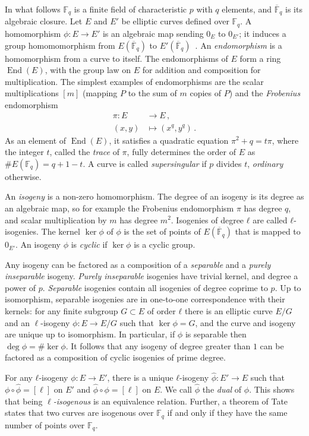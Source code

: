\documentclass{article}
\newcommand{\F}{\mathbb{F}}
\newcommand{\Fbar}{\overline{\mathbb{F}}}
\theoremstyle{definition}
\DeclareMathOperator{\End}{End}
\begin{document}
In what follows $\F_q$ is a finite field of characteristic $p$ with
$q$ elements, and $\Fbar_q$ is its algebraic closure. Let $E$ and $E'$
be elliptic curves defined over $\F_q$. 
A homomorphism $ϕ:E→E'$ is an
algebraic map sending $0_E$ to $0_{E'}$;
it induces a group homomomorphism from
$E(\Fbar_q)$ to $E'(\Fbar_q)$~\cite[III.4]{silverman:elliptic}.
An \emph{endomorphism} is a homomorphism from a curve to itself.
The endomorphisms of $E$ form a ring $\End(E)$,
with the group law on $E$ for addition
and composition for multiplication.
The simplest examples of endomorphisms
are the scalar multiplications $[m]$
(mapping $P$ to the sum of $m$ copies of $P$)
and the \emph{Frobenius} endomorphism
\begin{align*}
  π : E &\longrightarrow E \,, \\
  (x,y) &\longmapsto (x^q,y^q) \,.
\end{align*}
As an element of $\End(E)$, it satisfies a quadratic equation
$π^2 + q = tπ$, where the integer $t$, called the \emph{trace} of $π$,
fully determines the order of $E$ as $\#E(\F_q)=q+1-t$. A curve is
called \emph{supersingular} if $p$ divides $t$, \emph{ordinary}
otherwise.

An \emph{isogeny} is a non-zero homomorphism.
The
degree of an isogeny is its degree as an algebraic map,
so for example the Frobenius endomorphism $\pi$ has degree $q$,
and scalar multiplication by $m$ has degree $m^2$.
Isogenies of degree $ℓ$ are called $ℓ$-isogenies.
The kernel $\ker ϕ$ of $\phi$
is the set of points of $E(\Fbar_q)$ that is
mapped to $0_{E'}$. 
An isogeny $ϕ$ is \emph{cyclic} 
if $\ker ϕ$ is a cyclic group.

Any isogeny can be factored as a composition of a \emph{separable} and
a \emph{purely inseparable} isogeny. \emph{Purely inseparable}
isogenies have trivial kernel, and degree a power of $p$.
\emph{Separable} isogenies contain all
isogenies of degree coprime to $p$.
Up to isomorphism, separable isogenies
are in one-to-one correspondence with their kernels:
for any finite subgroup $G⊂E$ of order $ℓ$ there is 
an elliptic curve $E/G$ and an $\ell$-isogeny $\phi: E \to E/G$
such that $\ker \phi = G$,
and the curve and isogeny are unique up to isomorphism.
In particular, if $\phi$ is separable then $\deg ϕ=\#\ker ϕ$.
It follows
that any isogeny of degree greater than $1$ can be factored as a
composition of cyclic isogenies of prime degree.

For any $ℓ$-isogeny $ϕ:E→E'$, there is a unique $ℓ$-isogeny
$\hat{ϕ}:E'→E$ such that $ϕ∘\hat{ϕ} = [\ell]$ on $E'$
and $\hat{ϕ}∘ϕ = [\ell]$ on $E$.
We call $\hat{ϕ}$ the \emph{dual} of $ϕ$. This
shows that being \emph{$\ell$-isogenous} is an equivalence
relation. Further, a theorem of Tate states that two curves are
isogenous over $\F_q$ if and only if they have the same number of
points over $\F_q$.
\end{document}
